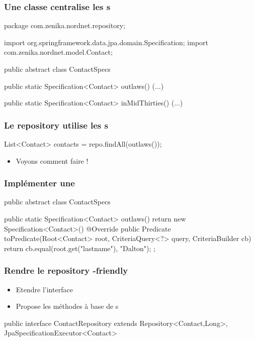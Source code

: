 \begin{frame}[fragile]
 \frametitle{Une classe centralise les s}

 \begin{javacode}
package com.zenika.nordnet.repository;

import org.springframework.data.jpa.domain.Specification;
import com.zenika.nordnet.model.Contact;

public abstract class ContactSpecs {

  public static Specification<Contact> outlaws() {
    (...)
  }
  
  public static Specification<Contact> inMidThirties() {
    (...)
  }
  
}
 \end{javacode}
\end{frame}

\begin{frame}[fragile]
 \frametitle{Le repository utilise les s}

 \begin{javacode}
List<Contact> contacts = repo.findAll(outlaws());
 \end{javacode}
 
 \begin{itemize}
  \item Voyons comment faire !
 \end{itemize}

\end{frame}

\begin{frame}[fragile]
 \frametitle{Implémenter une }

 \begin{javacode}
public abstract class ContactSpecs {

  public static Specification<Contact> outlaws() {
    return new Specification<Contact>() {
      @Override
      public Predicate toPredicate(Root<Contact> root,
               CriteriaQuery<?> query, CriteriaBuilder cb) {
        return cb.equal(root.get("lastname"), "Dalton");
      }
    };
  }
}
 \end{javacode}

\end{frame}

\begin{frame}[fragile]
 \frametitle{Rendre le repository -friendly}

 \begin{itemize}
  \item Etendre l'interface 
  \item Propose les méthodes à base de s
 \end{itemize}

 \begin{javacode}
public interface ContactRepository 
	    extends Repository<Contact,Long>,
	    JpaSpecificationExecutor<Contact> {


}
 \end{javacode}

\end{frame}

